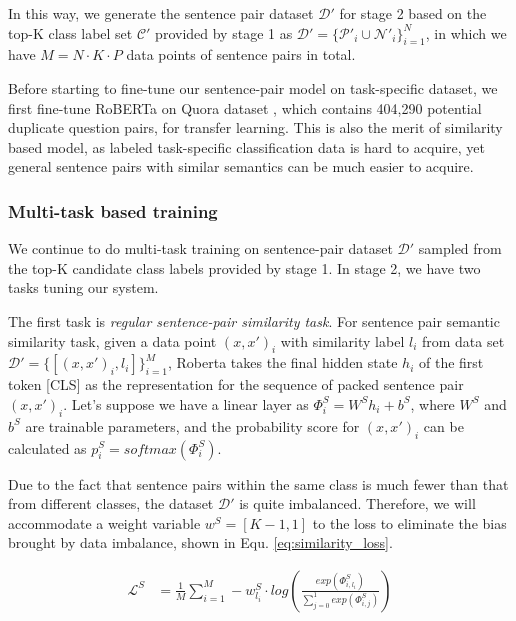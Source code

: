 \documentclass[letterpaper]{article} %
\begin{document}
  In  this way, we generate the sentence pair dataset $\mathcal{D'}$ for stage 2
  based  on  the  top-K  class  label  set $\mathcal{C'}$ provided by stage 1 as
  $\mathcal{D'}=\{\mathcal{P'}_{i}\cup  \mathcal{N'}_{i}\}_{i=1}^{N}$,  in which
  we have $M=N\cdot K\cdot P$ data points of sentence pairs in total.

  Before starting to fine-tune our sentence-pair model on task-specific dataset,
  we  first  fine-tune  RoBERTa  on  Quora  dataset  \cite{iyer2017first}, which
  contains  404,290  potential  duplicate question pairs, for transfer learning.
  This  is  also  the  merit of similarity based model, as labeled task-specific
  classification  data  is  hard  to  acquire,  yet  general sentence pairs with
  similar semantics can be much easier to acquire.

  \subsubsection*{Multi-task based training}
  We   continue  to  do  multi-task  training  on  sentence-pair  dataset
  $\mathcal{D'}$ sampled from the top-K candidate class labels provided by stage
  1. In stage 2, we have two tasks tuning our system.

  The first task is \emph{regular sentence-pair similarity task}.
  For  sentence  pair semantic similarity task, given a data point $(x, x')_{i}$
  with       similarity       label       $l_{i}$       from       data      set
  $\mathcal{D'}=\{[(x,x')_{i},l_{i}]\}_{i=1}^{M}$,   Roberta   takes  the  final
  hidden  state  $h_{i}$  of the first token [CLS] as the representation for the
  sequence of packed sentence pair $(x, x')_{i}$. Let's suppose we have a linear
  layer  as  ${\Phi}^S_{i}=W^Sh_{i}+b^S$,  where  $W^S$  and $b^S$ are trainable
  parameters,  and  the probability score for $(x, x')_{i}$ can be calculated as
  $p^S_{i}=softmax({\Phi}^S_{i})$.

  Due  to  the  fact that sentence pairs within the same class is much fewer than
  that from  different  classes,  the  dataset  $\mathcal{D'}$  is
  quite imbalanced.  Therefore, we will accommodate a weight variable $w^S = [K-1, 1]$
  to  the  loss  to eliminate the bias brought by data imbalance, shown in Equ.
  \ref{eq:similarity_loss}.

  \begin{equation}
    \begin{aligned}
      \mathcal{L}^{S}&=\frac{1}{M}\sum_{i=1}^{M}-w^S_{l_i}\cdot log(\frac{exp(\varPhi_{i,l_{i}}^S)}{\sum_{j=0}^{1}exp(\varPhi_{i,j}^S)}) \\
      \label{eq:similarity_loss}
    \end{aligned}
  \end{equation}
\end{document}
